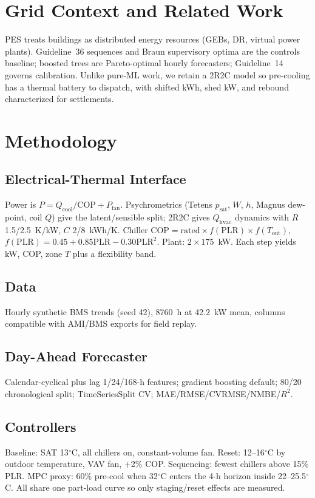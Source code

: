 \documentclass[conference, letterpaper, 10pt]{IEEEtran}
\begin{document}
\section{Grid Context and Related Work}
PES treats buildings as distributed energy resources (GEBs, DR, virtual power plants). Guideline~36 sequences and Braun supervisory optima are the controls baseline; boosted trees are Pareto-optimal hourly forecasters; Guideline~14 governs calibration. Unlike pure-ML work, we retain a 2R2C model so pre-cooling has a thermal battery to dispatch, with shifted kWh, shed kW, and rebound characterized for settlements.

\section{Methodology}
\subsection{Electrical-Thermal Interface}
Power is $P = Q_{\mathrm{cool}}/\mathrm{COP} + P_{\mathrm{fan}}$. Psychrometrics (Tetens $p_{\mathrm{sat}}$, $W$, $h$, Magnus dew-point, coil $Q$) give the latent/sensible split; 2R2C gives $Q_{\mathrm{hvac}}$ dynamics with $R$ 1.5/2.5~K/kW, $C$ 2/8~kWh/K. Chiller $\mathrm{COP} = \mathrm{rated}\times f(\mathrm{PLR})\times f(T_{\mathrm{out}})$, $f(\mathrm{PLR})=0.45+0.85\mathrm{PLR}-0.30\mathrm{PLR}^2$. Plant: $2\times175$~kW. Each step yields kW, COP, zone $T$ plus a flexibility band.

\subsection{Data}
Hourly synthetic BMS trends (seed 42), 8760~h at 42.2~kW mean, columns compatible with AMI/BMS exports for field replay.

\subsection{Day-Ahead Forecaster}
Calendar-cyclical plus lag 1/24/168-h features; gradient boosting default; 80/20 chronological split; TimeSeriesSplit CV; MAE/RMSE/CVRMSE/NMBE/$R^2$.

\subsection{Controllers}
Baseline: SAT 13$^\circ$C, all chillers on, constant-volume fan. Reset: 12--16$^\circ$C by outdoor temperature, VAV fan, +2\% COP. Sequencing: fewest chillers above 15\% PLR. MPC proxy: 60\% pre-cool when 32$^\circ$C enters the 4-h horizon inside 22--25.5$^\circ$C. All share one part-load curve so only staging/reset effects are measured.
\end{document}
